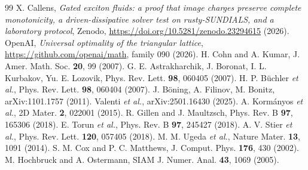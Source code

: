 \documentclass[11pt,a4paper]{article}
\begin{document}
\begin{thebibliography}{99}\small
{} X. Callens, \emph{Gated exciton fluids: a proof that image charges preserve complete monotonicity, a
driven-dissipative solver test on rusty-SUNDIALS, and a laboratory protocol}, Zenodo, \url{https://doi.org/10.5281/zenodo.23294615} (2026).
 OpenAI, \emph{Universal optimality of the triangular lattice}, \url{https://github.com/openai/math}, family 090 (2026).
 H. Cohn and A. Kumar, J. Amer. Math. Soc. \textbf{20}, 99 (2007).
 G. E. Astrakharchik, J. Boronat, I. L. Kurbakov, Yu. E. Lozovik, Phys. Rev. Lett. \textbf{98}, 060405 (2007).
 H. P. B\"uchler \emph{et al.}, Phys. Rev. Lett. \textbf{98}, 060404 (2007).
 J. B\"oning, A. Filinov, M. Bonitz, arXiv:1101.1757 (2011).
 Valenti \emph{et al.}, arXiv:2501.16430 (2025).
 A. Korm\'anyos \emph{et al.}, 2D Mater. \textbf{2}, 022001 (2015).
 R. Gillen and J. Maultzsch, Phys. Rev. B \textbf{97}, 165306 (2018).
 E. Torun \emph{et al.}, Phys. Rev. B \textbf{97}, 245427 (2018).
 A. V. Stier \emph{et al.}, Phys. Rev. Lett. \textbf{120}, 057405 (2018).
 M. M. Ugeda \emph{et al.}, Nature Mater. \textbf{13}, 1091 (2014).
 S. M. Cox and P. C. Matthews, J. Comput. Phys. \textbf{176}, 430 (2002).
 M. Hochbruck and A. Ostermann, SIAM J. Numer. Anal. \textbf{43}, 1069 (2005).
\end{thebibliography}
\end{document}
